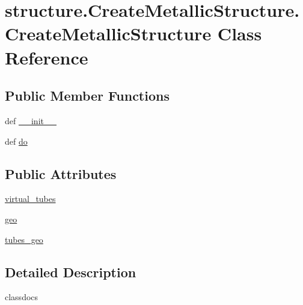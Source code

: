 \hypertarget{classstructure_1_1_create_metallic_structure_1_1_create_metallic_structure}{\section{structure.\-Create\-Metallic\-Structure.\-Create\-Metallic\-Structure Class Reference}
\label{classstructure_1_1_create_metallic_structure_1_1_create_metallic_structure}
}
\subsection*{Public Member Functions}
\begin{DoxyCompactItemize}
\item 
def \hyperlink{classstructure_1_1_create_metallic_structure_1_1_create_metallic_structure_ae4720a6598e94986d3bb318ded9b7c40}{\-\_\-\-\_\-init\-\_\-\-\_\-}
\item 
def \hyperlink{classstructure_1_1_create_metallic_structure_1_1_create_metallic_structure_a9e39fba01509e46944e6417568287537}{do}
\end{DoxyCompactItemize}
\subsection*{Public Attributes}
\begin{DoxyCompactItemize}
\item 
\hyperlink{classstructure_1_1_create_metallic_structure_1_1_create_metallic_structure_a2ce97b05962c83c3ac7d15c8c1c41f61}{virtual\-\_\-tubes}
\item 
\hyperlink{classstructure_1_1_create_metallic_structure_1_1_create_metallic_structure_aa80f203a5ab4d5dfae33a718fa1285c6}{geo}
\item 
\hyperlink{classstructure_1_1_create_metallic_structure_1_1_create_metallic_structure_ac92522654a56c4d4a91fd5b2f3be23e7}{tubes\-\_\-geo}
\end{DoxyCompactItemize}


\subsection{Detailed Description}
\begin{DoxyVerb}classdocs
\end{DoxyVerb}
 

